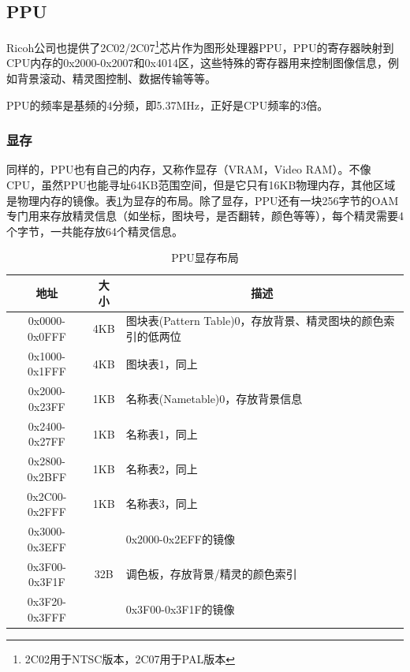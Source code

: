 \documentclass[a4paper]{ltxdoc}
\begin{document}
{\subsection{PPU}
Ricoh公司也提供了2C02/2C07\footnote{2C02用于NTSC版本，2C07用于PAL版本}芯片作为图形处理器PPU，PPU的寄存器映射到CPU内存的0x2000-0x2007和0x4014区，这些特殊的寄存器用来控制图像信息，例如背景滚动、精灵图控制、数据传输等等。

PPU的频率是基频的4分频，即5.37MHz，正好是CPU频率的3倍。

\subsubsection{显存}
同样的，PPU也有自己的内存，又称作显存（VRAM，Video RAM）。不像CPU，虽然PPU也能寻址64KB范围空间，但是它只有16KB物理内存，其他区域是物理内存的镜像。表\ref{tab:vram}为显存的布局。除了显存，PPU还有一块256字节的OAM专门用来存放精灵信息（如坐标，图块号，是否翻转，颜色等等），每个精灵需要4个字节，一共能存放64个精灵信息。

\begin{table}[h]
\centering
\caption{PPU显存布局}
\label{tab:vram}
\begin{tabularx}{\textwidth}{|c|c|X|}
\hline
\rowcolor[HTML]{8DCDFF}
地址          & 大小  & \multicolumn{1}{c|}{\cellcolor[HTML]{8DCDFF}描述} \\ \hline
0x0000-0x0FFF & 4KB & 图块表(Pattern Table)0，存放背景、精灵图块的颜色索引的低两位                       \\ \hline
0x1000-0x1FFF & 4KB & 图块表1，同上                              \\ \hline
0x2000-0x23FF & 1KB & 名称表(Nametable)0，存放背景信息                              \\ \hline
0x2400-0x27FF & 1KB & 名称表1，同上                                  \\ \hline
0x2800-0x2BFF & 1KB & 名称表2，同上                                  \\ \hline
0x2C00-0x2FFF & 1KB & 名称表3，同上                                  \\ \hline
0x3000-0x3EFF &     & 0x2000-0x2EFF的镜像                                  \\ \hline
0x3F00-0x3F1F & 32B & 调色板，存放背景/精灵的颜色索引                            \\ \hline
0x3F20-0x3FFF &     & 0x3F00-0x3F1F的镜像                                  \\ \hline
\end{tabularx}
\end{table}

}
\end{document}
